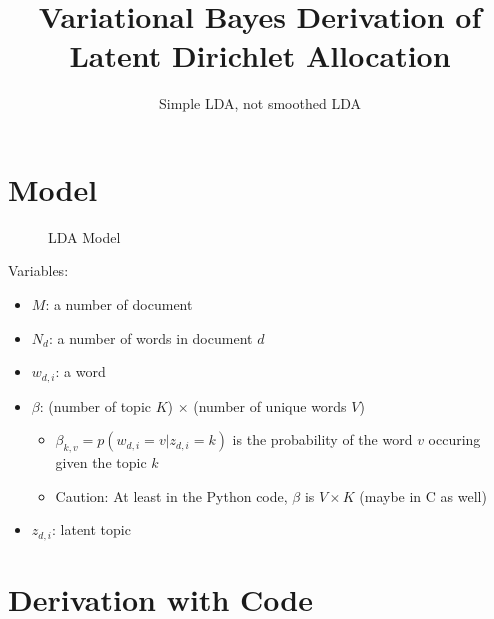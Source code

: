 \documentclass[a4paper,10.5pt,dvipdfmx]{jarticle}  %
\def\tightlist{
	\itemsep1pt
	\parskip1pt
	\parsep1pt
	\itemindent20pt
}
\begin{document}
\title{Variational Bayes Derivation of Latent Dirichlet Allocation}
\author{Simple LDA, not smoothed LDA}
\maketitle

\section{Model}
\begin{figure}[H]
\centering
{}
\caption{LDA Model}
\end{figure}
Variables:
\begin{itemize}
	\tightlist
	\item $M$: a number of document
	\item $N_d$: a number of words in document $d$
	\item $w_{d,i}$: a word
	\item $\beta$: (number of topic $K$) $\times$ (number of unique words $V$)
		\begin{itemize}
				\tightlist
			\item $\beta_{k,v} = p(w_{d,i} = v|z_{d,i}=k)$ is the probability of the word $v$ occuring given the topic $k$
			\item Caution: At least in the Python code, $\beta$ is $V \times K$ (maybe in C as well)
		\end{itemize}
	\item $z_{d,i}$: latent topic
\end{itemize}

\section{Derivation with Code}
\end{document}
